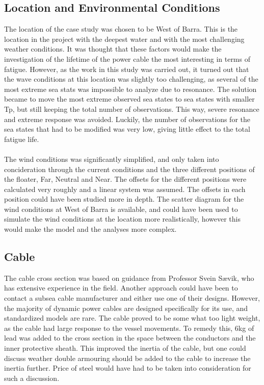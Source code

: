 \subsection{Location and Environmental Conditions}
The location of the case study was chosen to be West of Barra. This is the location in the project with the deepest water and with the most challenging weather conditions. It was thought that these factors would make the investigation of the lifetime of the power cable the most interesting in terms of fatigue. However, as the work in this study was carried out, it turned out that the wave conditions at this location was slightly too challenging, as several of the most extreme sea stats was impossible to analyze due to resonance. The solution became to move the most extreme observed sea states to sea states with smaller Tp, but still keeping the total number of observations. This way, severe resonance and extreme response was avoided. Luckily, the number of observations for the sea states that had to be modified was very low, giving little effect to the total fatigue life.\\\\
The wind conditions was significantly simplified, and only taken into concideration through the current conditions and the three different positions of the floater, Far, Neutral and Near. The offsets for the different positions were calculated very roughly and a linear system was assumed. The offsets in each position could have been studied more in depth. The scatter diagram for the wind conditions at West of Barra is available, and could have been used to simulate the wind conditions at the location more realistically, however this would make the model and the analyses more complex.


\subsection{Cable}
The cable cross section was based on guidance from Professor Svein Sævik, who has extensive experience in the field. Another approach could have been to contact a subsea cable manufacturer and either use one of their designs.  However, the majority of dynamic power cables are designed specifically for its use, and standardized models are rare. The cable proved to be some what too light weight, as the cable had large response to the vessel movements. To remedy this, 6kg of lead was added to the cross section in the space between the conductors and the inner protective sheath. This improved the inertia of the cable, but one could discuss weather double armouring should be added to the cable to increase the inertia further. Price of steel would have had to be taken into consideration for such a discussion.
